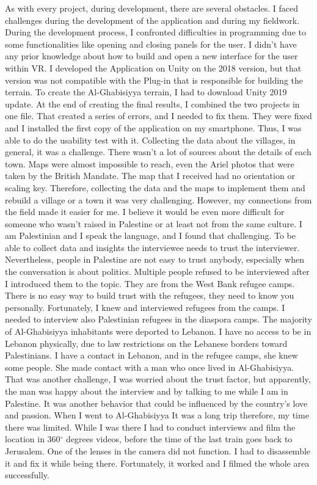 As with every project, during development, there are several obstacles. I faced challenges during the development of the application and during my fieldwork. During the development process, I confronted difficulties in programming due to some functionalities like opening and closing panels for the user. I didn't have any prior knowledge about how to build and open a new interface for the user within VR. I developed the Application on Unity on the 2018 version, but that version was not compatible with the Plug-in that is responsible for building the terrain. To create the Al-Ghabisiyya terrain, I had to download Unity 2019 update. At the end of creating the final results, I combined the two projects in one file. That created a series of errors, and I needed to fix them. They were fixed and I installed the first copy of the application on my smartphone. Thus, I was able to do the usability test with it. 
Collecting the data about the villages, in general, it was a challenge. There wasn't a lot of sources about the details of each town. Maps were almost impossible to reach, even the Ariel photos that were taken by the British Mandate.  The map that I received had no orientation or scaling key. Therefore, collecting the data and the maps to implement them and rebuild a village or a town it was very challenging. However, my connections from the field made it easier for me. I believe it would be even more difficult for someone who wasn't raised in Palestine or at least not from the same culture. I am Palestinian and I speak the language, and I found that challenging. To be able to collect data and insights the interviewee needs to trust the interviewer. Nevertheless, people in Palestine are not easy to trust anybody, especially when the conversation is about politics. Multiple people refused to be interviewed after I introduced them to the topic. They are from the West Bank refugee camps. There is no easy way to build trust with the refugees, they need to know you personally. Fortunately, I knew and interviewed refugees from the camps. I needed to interview also Palestinian refugees in the diaspora camps. The majority of Al-Ghabisiyya inhabitants were deported to Lebanon. I have no access to be in Lebanon physically, due to law restrictions on the Lebanese borders toward Palestinians. I have a contact in Lebanon, and in the refugee camps, she knew some people. She made contact with a man who once lived in Al-Ghabisiyya. That was another challenge, I was worried about the trust factor, but apparently, the man was happy about the interview and by talking to me while I am in Palestine. It was another behavior that could be influenced by the country's love and passion.  When I went to Al-Ghabisiyya It was a long trip therefore, my time there was limited. While I was there I had to conduct interviews and film the location in 360$^{\circ}$ degrees videos, before the time of the last train goes back to Jerusalem. One of the lenses in the camera did not function. I had to disassemble it and fix it while being there. Fortunately, it worked and I filmed the whole area successfully. 